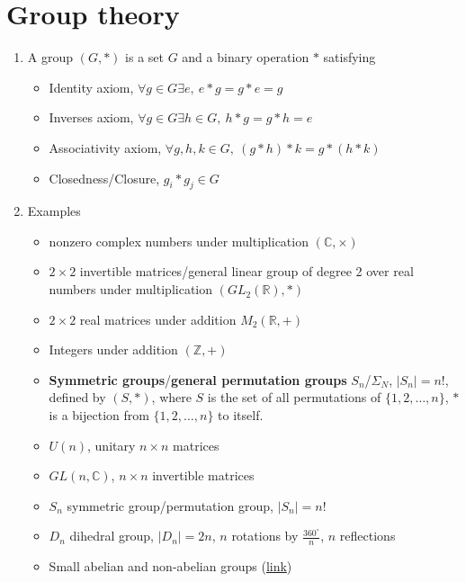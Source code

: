 \documentclass{article}
\theoremstyle{remark}
\theoremstyle{remark}
\begin{document}
\section*{Group theory}
    \begin{enumerate}
        \item A group $(G,*)$ is a set $G$ and a binary operation $*$ satisfying\begin{itemize}
                \item Identity axiom, $\forall g\in G\exists e,\ e*g=g*e=g$
                \item Inverses axiom, $\forall g\in G\exists h\in G,\ h*g=g*h=e$
                \item Associativity axiom, $\forall g,h,k\in G,\ (g*h)*k=g*(h*k)$
                \item Closedness/Closure, $g_i* g_j\in G$
            \end{itemize}
        \item Examples\begin{itemize}
                \item nonzero complex numbers under multiplication $(\mathbb{C},\times)$
                \item $2\times2$ invertible matrices/general linear group of degree 2 over real numbers under multiplication $(GL_2(\mathbb{R}),*)$
                \item $2\times2$ real matrices under addition $M_2(\mathbb{R}, +)$
                \item Integers under addition $(\mathbb{Z},+)$
                \item \textbf{Symmetric groups}/\textbf{general permutation groups} $S_n$/$\Sigma_N$, $|S_n|=n!$, defined by $(S,*)$, where $S$ is the set of all permutations of $\{1,2,\ldots,n\}$, $*$ is a bijection from $\{1,2,\ldots,n\}$ to itself.
                \item $U(n)$, unitary $n\times n$ matrices
                \item $GL(n,\mathbb{C})$, $n\times n$ invertible matrices
                \item $S_n$ symmetric group/permutation group, $|S_n|=n!$
                \item $D_n$ dihedral group, $|D_n|=2n$, $n$ rotations by $\frac{360^\circ}{n}$, $n$ reflections
                \item Small abelian and non-abelian groups (\href{https://en.wikipedia.org/wiki/List_of_small_groups}{link})
            \end{itemize}

\end{enumerate}
\end{document}
